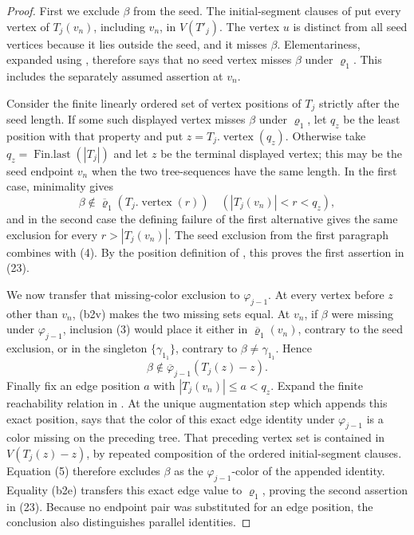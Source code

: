 \begin{proof}
First we exclude \(\beta\) from the seed.  The initial-segment clauses of
 put every vertex of \(T_j(v_n)\),
including \(v_n\), in \(V(T'_j)\).  The vertex \(u\) is distinct from
all seed vertices because it lies outside the seed, and it misses
\(\beta\).  Elementariness, expanded using
, therefore says that no seed vertex
misses \(\beta\) under \(\varrho_1\).  This includes the separately
assumed assertion at \(v_n\).

Consider the finite linearly ordered set of vertex positions of \(T_j\)
strictly after the seed length.  If some such displayed vertex misses
\(\beta\) under \(\varrho_1\), let \(q_z\) be the least position with
that property and put \(z=T_j.\operatorname{vertex}(q_z)\).  Otherwise
take \(q_z=\operatorname{Fin.last}(|T_j|)\) and let \(z\) be the terminal
displayed vertex; this may be the seed endpoint \(v_n\) when the two
tree-sequences have the same length.  In the first case, minimality gives
\[
 \beta\notin\overline{\varrho}_1(T_j.\operatorname{vertex}(r))
 \quad(|T_j(v_n)|<r<q_z),                                    \tag{4}
\]
and in the second case the defining failure of the first alternative
gives the same exclusion for every \(r>|T_j(v_n)|\).  The seed exclusion
from the first paragraph combines with (4).  By the position definition
of , this proves the first assertion in
(23).

We now transfer that missing-color exclusion to
\(\varphi_{j-1}\).  At every vertex before \(z\) other than \(v_n\),
(b2v) makes the two missing sets equal.  At \(v_n\), if \(\beta\) were
missing under \(\varphi_{j-1}\), inclusion (3) would place it either in
\(\overline{\varrho}_1(v_n)\), contrary to the seed exclusion, or in the
singleton \(\{\gamma_{1_1}\}\), contrary to
\(\beta\ne\gamma_{1_1}\).  Hence
\[
 \beta\notin\overline\varphi_{j-1}(T_j(z)-z).                  \tag{5}
\]
Finally fix an edge position \(a\) with
\(|T_j(v_n)|\le a<q_z\).  Expand the finite reachability relation in
.  At the unique augmentation step
which appends this exact position,  says
that the color of this exact edge identity under \(\varphi_{j-1}\) is a
color missing on the preceding tree.  That preceding vertex set is
contained in \(V(T_j(z)-z)\), by repeated composition of the ordered
initial-segment clauses.  Equation (5) therefore excludes \(\beta\) as
the \(\varphi_{j-1}\)-color of the appended identity.  Equality (b2e)
transfers this exact edge value to \(\varrho_1\), proving the second
assertion in (23).  Because no endpoint pair was substituted for an edge
position, the conclusion also distinguishes parallel identities.
\end{proof}
